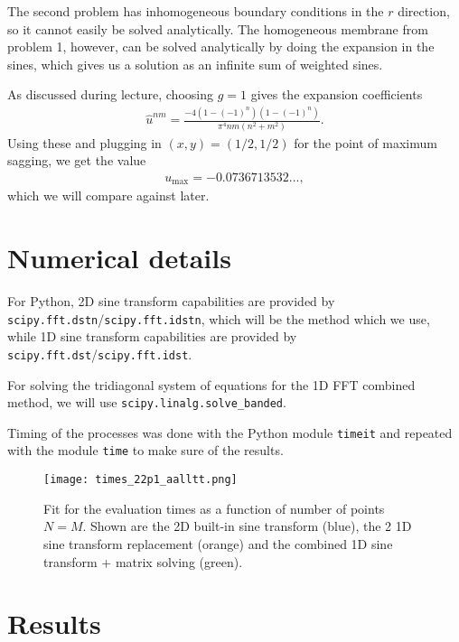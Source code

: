 \documentclass[10pt,a4paper,twocolumn]{article}
\begin{document}
The second problem has inhomogeneous boundary conditions in the $r$ direction, so it cannot easily be solved analytically. The homogeneous membrane from problem 1, however, can be solved analytically by doing the expansion in the sines, which gives us a solution as an infinite sum of weighted sines.

As discussed during lecture, choosing $g=1$ gives the expansion coefficients
\begin{align}
    \hat{u}^{nm} = \frac{-4\left(1-(-1)^n\right)\left(1-(-1)^n\right)}{\pi^4 nm (n^2 + m^2)}.
\end{align}
%
Using these and plugging in $(x,y) = (1/2, 1/2)$ for the point of maximum sagging, we get the value
%
\begin{align}
    u_{\mathrm{max}} = -0.0736713532...,
\end{align}
%
which we will compare against later.


\section{Numerical details}

For Python, 2D sine transform capabilities are provided by \texttt{scipy.fft.dstn}/\texttt{scipy.fft.idstn}, which will be the method which we use, while 1D sine transform capabilities are provided by \texttt{scipy.fft.dst}/\texttt{scipy.fft.idst}.

For solving the tridiagonal system of equations for the 1D FFT combined method, we will use \texttt{scipy.linalg.solve\_banded}.

Timing of the processes was done with the Python module \texttt{timeit} and repeated with the module \texttt{time} to make sure of the results. 


\begin{figure}[!h]
    \centering
    \texttt{[image: times\_22p1\_aalltt.png]}
    \caption{Fit for the evaluation times as a function of number of points $N = M$. Shown are the 2D built-in sine transform (blue), the 2 1D sine transform replacement (orange) and the combined 1D sine transform + matrix solving (green).}
    \label{fig:times_1}
\end{figure}

\section{Results}
\end{document}
